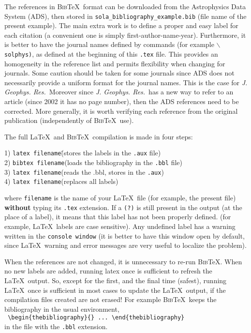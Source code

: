 \documentclass[namedreferences]{solarphysics}
\newcommand{\BibTeX}{\textsc{Bib}\TeX}
\newcommand{\jgr}{    {\it J. Geophys. Res.}}
\begin{document}
\begin{article}
{  %
  The references in \BibTeX\ format can be downloaded from the 
Astrophysics Data System (ADS), then stored
in \verb+sola_bibliography_example.bib+  (file name of the present example).
The main extra work is to define a proper and easy label for each citation
(a convenient one is simply first-author-name-year).  Furthermore, it is better
to have the journal names defined by commands (for example 
\texttt{$\backslash$solphys)}, as defined at the beginning of 
this \texttt{.tex} file.
This provides an homogeneity in the reference list and permits flexibility
when changing for journals.   Some caution should be taken for some journals
since ADS does not necessarily provide a uniform format for the
journal names. This is the case for \jgr\  Moreover since
\jgr\ has a new way to refer to an article 
(since 2002 it has no page number), then the ADS references need to be corrected. 
More generally, it is worth verifying
each reference from the original publication (independently of \BibTeX\ use).

   The full \LaTeX\ and \BibTeX\ compilation is made in four steps: 
\begin{tabbing}
1) {\tt latex filename}\qquad\qquad\=(stores the labels in the {\tt .aux} file)\\
2) {\tt bibtex filename}\>(loads the bibliography in the {\tt .bbl} file)\\
3) {\tt latex filename}\>(reads the .bbl, stores in the {\tt .aux})\\
4) {\tt latex filename}\>(replaces all labels)  
\end{tabbing}
   where \texttt{filename} is the name of your \LaTeX\ file (for example, 
the present file) {\bf without} typing its \texttt{.tex} extension.
If a \texttt{(?)} is still present in the output (at the place of a label),
it means that this label has not been properly defined. 
 (for example, \LaTeX\ labels are case sensitive).
Any undefined label has a warning written in the \texttt{console window}
(it is better to have this window open by default, since \LaTeX\ warning and 
error messages are very useful to localize the problem).

  When the references are not changed, it is unnecessary to re-run \BibTeX .
When no new labels are added, running latex once is sufficient to refresh
the \LaTeX\ output. So, except for
the first, and the final time (safest), running \LaTeX\ once is sufficient
in most cases to update the \LaTeX\ output, if the compilation files 
created are not erased! For example \BibTeX\ keeps the bibliography in the usual 
environment,\\
  \verb+ \begin{thebibliography}{} ... \end{thebibliography}+\\
in the file with the \verb+.bbl+ extension.  

}
\end{article}
\end{document}
